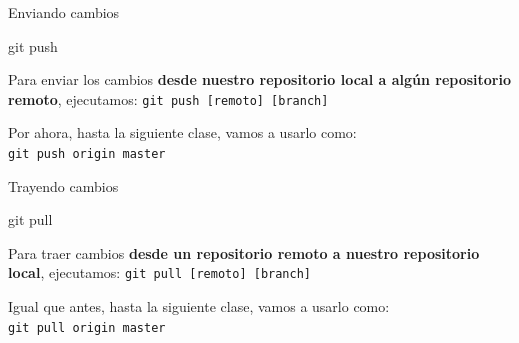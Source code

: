 \begin{frame}[t]{Enviando cambios}
    \begin{comando}
        git push
    \end{comando}

    \pause
    \begin{block}{}
        Para enviar los cambios \textbf{desde nuestro repositorio local a algún
        repositorio remoto}, ejecutamos: \texttt{git push [remoto] [branch]}

        \vspace{0.5em}

        Por ahora, hasta la siguiente clase, vamos a usarlo como:\\ \texttt{git push origin master}
    \end{block}
\end{frame}

\begin{frame}[t]{Trayendo cambios}
    \begin{comando}
        git pull
    \end{comando}

    \pause
    \begin{block}{}
        Para traer cambios \textbf{desde un repositorio remoto a nuestro repositorio local},
        ejecutamos: \texttt{git pull [remoto] [branch]}

        \vspace{0.5em}

        Igual que antes, hasta la siguiente clase, vamos a usarlo como:\\ \texttt{git pull origin master}
    \end{block}
\end{frame}

